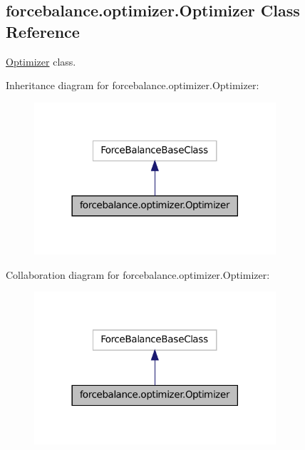 \hypertarget{classforcebalance_1_1optimizer_1_1Optimizer}{\subsection{forcebalance.\-optimizer.\-Optimizer Class Reference}
\label{classforcebalance_1_1optimizer_1_1Optimizer}
}


\hyperlink{classforcebalance_1_1optimizer_1_1Optimizer}{Optimizer} class.  




Inheritance diagram for forcebalance.\-optimizer.\-Optimizer\-:
\nopagebreak
\begin{figure}[H]
\begin{center}
\leavevmode
\includegraphics[width=254pt]{classforcebalance_1_1optimizer_1_1Optimizer__inherit__graph}
\end{center}
\end{figure}


Collaboration diagram for forcebalance.\-optimizer.\-Optimizer\-:
\nopagebreak
\begin{figure}[H]
\begin{center}
\leavevmode
\includegraphics[width=254pt]{classforcebalance_1_1optimizer_1_1Optimizer__coll__graph}
\end{center}
\end{figure}
